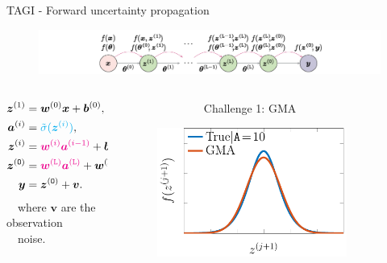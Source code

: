 \documentclass[final]{beamer}
\begin{document}
\begin{frame}[t]
\begin{columns}
\begin{column}[T]{.31\textwidth}
\vspace{-0.7cm}

\begin{block}{TAGI - Forward uncertainty propagation}
 \begin{figure}[h!]
 \centering
  \includegraphics[width=1\textwidth]{Figures/forward_pass.pdf}
 \end{figure}

 \begin{columns}
 \begin{column}{0.33\textwidth}
\begin{equation*} \label{eq:nn}
\begin{split}
\bm{z}^{(1)} &= \bm{w}^{(0)} \bm{x} + \bm{b}^{(0)}, \\
\bm{a}^{(i)} &= {\color{cyan}\tilde{\sigma}(\bm{z}^{(i)})}, \\
\bm{z}^{(i)} &= {\color{magenta}\bm{w}^{(i)} \bm{a}^{(i-1)}} + \bm{b}^{(i)}, \\
\bm{z}^{(\mathtt{O})} &=  {\color{magenta}\bm{w}^{(\mathtt{L})} \bm{a}^{(\mathtt{L})}} + \bm{w}^{(\mathtt{L})} \\
\bm{y} &=  \bm{z}^{(\mathtt{O})} + \bm{v}.
\end{split}
\end{equation*} 
\ \ where $\bm{v}$ are the observation \\ \ \ noise.
\end{column}

\begin{column}{0.33\textwidth}
\ \ \ \ \ \ \ \ \ \ \ \ \ \ {\color{magenta}Challenge 1:} GMA
\vspace{1.1cm}
 \begin{figure}[h!]
 \centering
  \includegraphics[width=0.85\textwidth]{Figures/GMA_CLT_10.pdf}
 \end{figure}
\vspace{1cm}


\end{column}
\end{columns}
\end{block}
\end{column}
\end{columns}
\end{frame}
\end{document}
